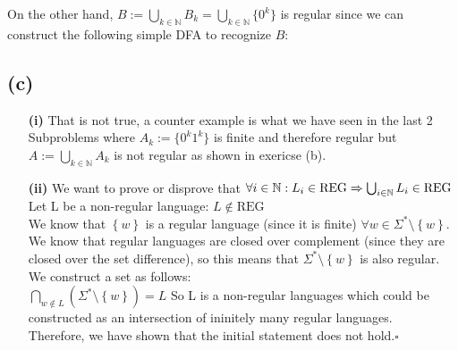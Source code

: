 On the other hand, \( B := \bigcup_{k \in \mathbb{N}} B_k = \bigcup_{k \in \mathbb{N}} \{0^k\} \) is regular since we can construct the following simple DFA to recognize \( B \):

\begin{center}
\end{center}

\subsection{(c)}

\begin{enumerate}
    \item[\textbf{(i)}] That is not true, a counter example is what we have seen in the last 2 Subproblems where $A_k := \{0^k1^k\}$ is finite and therefore regular but \( A := \bigcup_{k \in \mathbb{N}} A_k \) is not regular as shown in exericse (b).

    \item[\textbf{(ii)}] We want to prove or disprove that $\forall i \in \mathbb{N}: L_{i} \in \text{REG} \Rightarrow \bigcup_{i\in \mathbb{N}}  L_{i} \in \text{REG}$\\
    Let L be a non-regular language: $L \notin \text{REG}$\\
    We know that $\left\{w\right\}$ is a regular language (since it is finite) $\forall w \in \Sigma^{\ast}\setminus \left\{w\right\}$.\\
    We know that regular languages are closed over complement (since they are closed over the set difference), so this means that $\Sigma^{\ast}\setminus \left\{w\right\}$ is also regular.\\
    We construct a set as follows:\\
    $\bigcap_{w\notin L}(\Sigma^{\ast}\setminus\left\{w\right\}) = L$
    So L is a non-regular languages which could be constructed as an intersection of ininitely many regular languages.\\
    Therefore, we have shown that the initial statement does not hold.$\square$
\end{enumerate}



